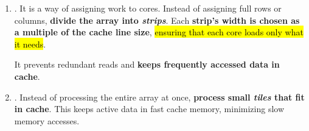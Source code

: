 \begin{enumerate}
    
    \item {}. It is a way of assigning work to cores. Instead of assigning full rows or columns, \textbf{divide the array into \emph{strips}}. Each \textbf{strip's width is chosen as a multiple of the cache line size}, \hl{ensuring that each core loads only what it needs}.
    
    It prevents redundant reads and \textbf{keeps frequently accessed data in cache}.
    
    
    \item {}. Instead of processing the entire array at once, \textbf{process small \emph{tiles} that fit in cache}. This keeps active data in fast cache memory, minimizing slow memory accesses.
\end{enumerate}
